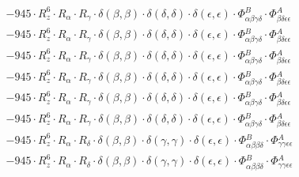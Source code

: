 \documentclass{article}
\begin{document}
\begin{subequations}
\begin{gather}
\begin{array}{c}
 \\[0.2em] 		 - 945 \cdot R_{z}^{6} \cdot R_{\alpha{}} \cdot R_{\gamma{}} \cdot \delta{}\left(\beta{}, \beta{}\right) \cdot \delta{}\left(\delta{}, \delta{}\right) \cdot \delta{}\left(\epsilon{}, \epsilon{}\right) \cdot \Phi{}^{B}_{\alpha{}\beta{}\gamma{}\delta{}} \cdot \Phi{}^{A}_{\beta{}\delta{}\epsilon{}\epsilon{}} 
 \\[0.2em] 		 - 945 \cdot R_{z}^{6} \cdot R_{\alpha{}} \cdot R_{\gamma{}} \cdot \delta{}\left(\beta{}, \beta{}\right) \cdot \delta{}\left(\delta{}, \delta{}\right) \cdot \delta{}\left(\epsilon{}, \epsilon{}\right) \cdot \Phi{}^{B}_{\alpha{}\beta{}\gamma{}\delta{}} \cdot \Phi{}^{A}_{\beta{}\delta{}\epsilon{}\epsilon{}} 
 \\[0.2em] 		 - 945 \cdot R_{z}^{6} \cdot R_{\alpha{}} \cdot R_{\gamma{}} \cdot \delta{}\left(\beta{}, \beta{}\right) \cdot \delta{}\left(\delta{}, \delta{}\right) \cdot \delta{}\left(\epsilon{}, \epsilon{}\right) \cdot \Phi{}^{B}_{\alpha{}\beta{}\gamma{}\delta{}} \cdot \Phi{}^{A}_{\beta{}\delta{}\epsilon{}\epsilon{}} 
 \\[0.2em] 		 - 945 \cdot R_{z}^{6} \cdot R_{\alpha{}} \cdot R_{\gamma{}} \cdot \delta{}\left(\beta{}, \beta{}\right) \cdot \delta{}\left(\delta{}, \delta{}\right) \cdot \delta{}\left(\epsilon{}, \epsilon{}\right) \cdot \Phi{}^{B}_{\alpha{}\beta{}\gamma{}\delta{}} \cdot \Phi{}^{A}_{\beta{}\delta{}\epsilon{}\epsilon{}} 
 \\[0.2em] 		 - 945 \cdot R_{z}^{6} \cdot R_{\alpha{}} \cdot R_{\gamma{}} \cdot \delta{}\left(\beta{}, \beta{}\right) \cdot \delta{}\left(\delta{}, \delta{}\right) \cdot \delta{}\left(\epsilon{}, \epsilon{}\right) \cdot \Phi{}^{B}_{\alpha{}\beta{}\gamma{}\delta{}} \cdot \Phi{}^{A}_{\beta{}\delta{}\epsilon{}\epsilon{}} 
 \\[0.2em] 		 - 945 \cdot R_{z}^{6} \cdot R_{\alpha{}} \cdot R_{\gamma{}} \cdot \delta{}\left(\beta{}, \beta{}\right) \cdot \delta{}\left(\delta{}, \delta{}\right) \cdot \delta{}\left(\epsilon{}, \epsilon{}\right) \cdot \Phi{}^{B}_{\alpha{}\beta{}\gamma{}\delta{}} \cdot \Phi{}^{A}_{\beta{}\delta{}\epsilon{}\epsilon{}} 
 \\[0.2em] 		 - 945 \cdot R_{z}^{6} \cdot R_{\alpha{}} \cdot R_{\delta{}} \cdot \delta{}\left(\beta{}, \beta{}\right) \cdot \delta{}\left(\gamma{}, \gamma{}\right) \cdot \delta{}\left(\epsilon{}, \epsilon{}\right) \cdot \Phi{}^{B}_{\alpha{}\beta{}\beta{}\delta{}} \cdot \Phi{}^{A}_{\gamma{}\gamma{}\epsilon{}\epsilon{}} 
 \\[0.2em] 		 - 945 \cdot R_{z}^{6} \cdot R_{\alpha{}} \cdot R_{\delta{}} \cdot \delta{}\left(\beta{}, \beta{}\right) \cdot \delta{}\left(\gamma{}, \gamma{}\right) \cdot \delta{}\left(\epsilon{}, \epsilon{}\right) \cdot \Phi{}^{B}_{\alpha{}\beta{}\beta{}\delta{}} \cdot \Phi{}^{A}_{\gamma{}\gamma{}\epsilon{}\epsilon{}} 

\end{array}
\end{gather}
\end{subequations}
\end{document}
